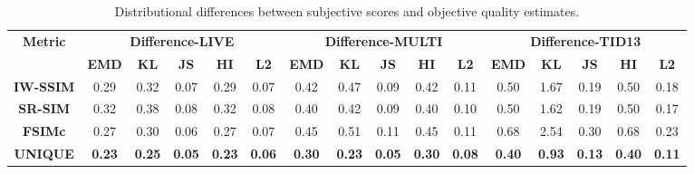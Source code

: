 \documentclass[draftcls,12pt, onecolumn]{IEEEtran}
\begin{document}
\begin{center}

\begin{table*}[htbp!]\centering
      \scriptsize
      \vspace{-2.0mm}
        \caption{Distributional differences between subjective scores and objective quality estimates.}
        \vspace{-2.0mm}


    \begin{tabular}{c||c|c|c|c|c||c|c|c|c|c||c|c|c|c|c}   \hline
    \multirow{2}[4]{*}{\textbf{Metric}} 
    
    & \multicolumn{5}{c||}{\textbf{Difference-LIVE}} & \multicolumn{5}{c||}{\textbf{Difference-MULTI}} & \multicolumn{5}{c}{\textbf{Difference-TID13}} \\ \cline{2-16}     
    
          & \textbf{EMD}& \textbf{KL}& \textbf{JS}& \textbf{HI}& \textbf{L2}& \textbf{EMD}& \textbf{KL}& \textbf{JS}& \textbf{HI}& \textbf{L2}  & \textbf{EMD}& \textbf{KL}& \textbf{JS}& \textbf{HI}& \textbf{L2}    
          \\ \hline 


	\textbf{IW-SSIM \cite{Wang2011}}  &  0.29  &  0.32  &  0.07 &   0.29  &  0.07 &   0.42   & 0.47 &  0.09  &  0.42  &  0.11 &   0.50 &   1.67 &   0.19 &   0.50  &  0.18
  \\ 

	\textbf{SR-SIM \cite{Zhang12}}   &  0.32  &  0.38  &  0.08 &   0.32  &  0.08 &    0.40  &  0.42  &  0.09  &  0.40  & 0.10 &   0.50 &   1.62 &   0.19 &   0.50  &  0.17
 \\ 
	
		\textbf{FSIMc \cite{Zhang2011}}  &  0.27  &  0.30  &  0.06  &  0.27   & 0.07 &   0.45  &  0.51 &  0.11  &  0.45  &  0.11 &   0.68  &  2.54 &   0.30  &  0.68 &   0.23
 \\ 

				
				\textbf{UNIQUE}  &  \bf 0.23  & \bf 0.25 &  \bf 0.05  &   \bf 0.23  & \bf 0.06 &  \bf 0.30 &  \bf 0.23  & \bf 0.05 &  \bf 0.30  &  \bf 0.08 &  \bf  0.40 &  \bf 0.93 & \bf  0.13 &  \bf 0.40  & \bf 0.11
\\ \hline
	
    \end{tabular}\label{tab:hist_dist}
\vspace{-4.0mm}

\end{table*} 

 \end{center}
\end{document}
